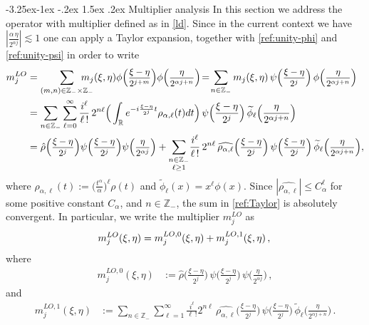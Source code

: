 \documentclass[a4paper,reqno]{amsart}
\makeatletter
\def\subsection{\@startsection{subsection}{2}{\z@}%
	{-3.25ex\@plus -1ex \@minus -.2ex}%
	{1.5ex \@plus .2ex}%
	{\normalfont\bfseries\boldmath}}
\numberwithin{equation}{section}
\theoremstyle{definition}
\newcommand{\R}{\mathbb{R}}
\newcommand{\Z}{\mathbb{Z}}
\newcommand{\sdfrac}[2]{\mbox{\small$\displaystyle\frac{#1}{#2}$}}
\def\a{\alpha}
\makeatother
\begin{document}
\subsection{Multiplier analysis}
In this section we address the operator with multiplier defined as in \eqref{ld}. Since in the current context we have $|\frac{\a\,\eta}{2^{\a j}}|\lesssim 1$ one can apply a Taylor expansion, together  with \eqref{ref:unity-phi} and \eqref{ref:unity-psi} in order to write
\begin{align}
	m_j^{LO}&=\sum_{(m,n)\in \Z_{-}\times\Z_{-}}\hspace{-.5cm} m_j(\xi,\eta)\phi\Big(\sdfrac{\xi-\eta}{2^{j+m}}\Big)\phi\Big(\sdfrac{\eta}{2^{\a j+n}}\Big)\!=\!\sum_{n\in \Z_-} m_j(\xi,\eta)\,\psi\Big(\sdfrac{\xi-\eta}{2^{j}}\Big)\,\phi\Big(\sdfrac{\eta}{2^{\a j+n}}\Big)\nonumber\\
	&=\sum_{n\in\Z_-}\sum_{\ell=0}^\infty \frac{i^\ell}{\ell\,!}\,2^{n\ell} \Big(\int_\R e^{-i\frac{\xi-\eta}{2^j}t} \rho_{\a,\ell}(t)dt\Big)\, \psi\Big(\frac{\xi-\eta}{2^{j}}\Big)\,\widetilde{\phi}_\ell\Big(\frac{\eta}{2^{\a j+n}}\Big)\nonumber\\
	&=\hat{\rho} \Big(\sdfrac{\xi-\eta}{2^j}\Big)\psi\Big(\sdfrac{\xi-\eta}{2^{j}}\Big)\psi\Big(\sdfrac{\eta}{2^{\a j}}\Big)
	+ \sum_{\substack{n\in\Z_-\\ \ell\ge 1}}\! \frac{i^\ell}{\ell\,!}\, 2^{n\ell}\, \widehat{\rho_{\a,\ell}} \Big(\sdfrac{\xi-\eta}{2^j}\Big)\,\psi\Big(\sdfrac{\xi-\eta}{2^{j}}\Big)\, \widetilde{\phi}_\ell\Big(\sdfrac{\eta}{2^{\a j+n}}\Big), \raisetag{1\baselineskip}\label{ref:Taylor}
\end{align}
where $\rho_{\a,\ell}(t):=\big(\frac{t^\a}{\a}\big)^\ell \rho(t)$ and $\widetilde{\phi}_\ell(x)=x^\ell \phi(x)$. Since $|\widehat{\rho_{\a,\ell}}|\le C_{\a}^\ell$ for some positive constant $C_{\a}$, and $n\in\Z_-$, the sum in \eqref{ref:Taylor} is absolutely convergent. In particular, we write the multiplier $m_j^{LO}$ as
\begin{equation}\label{Taylor-mjL0}
	m_j^{LO}(\xi,\eta)=m_j^{LO,0}(\xi,\eta)+m_j^{LO,1}(\xi,\eta)\,,\\
\end{equation}
where
\begin{align}
	m_j^{LO,0}(\xi,\eta)&:=\hat{\rho} \Big(\frac{\xi-\eta}{2^j}\Big)\,\psi\Big(\frac{\xi-\eta}{2^{j}}\Big)\, \psi\Big(\frac{\eta}{2^{\a j}}\Big)\,,\label{ref:mjL0}
\end{align}
and
\begin{align}
	m_j^{LO,1}(\xi,\eta)&:=\sum_{n\in\Z_-} \sum_{\ell=1}^\infty \frac{i^\ell}{\ell\,!} 2^{n\ell}\, \widehat{\rho_{\a,\ell}} \Big(\frac{\xi-\eta}{2^j}\Big)\,\psi\Big(\frac{\xi-\eta}{2^{j}}\Big)\, \widetilde{\phi}_\ell\Big(\frac{\eta}{2^{\a j+n}}\Big)\,.\label{ref:mjLO1}
\end{align}
\end{document}
